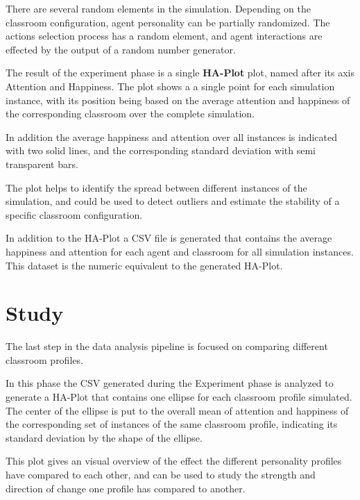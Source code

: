 There are several random elements in the simulation. Depending on the classroom
configuration, agent personality can be partially randomized. The actions selection
process has a random element, and agent interactions are effected by the output of
a random number generator.

\bb

The result of the experiment phase is a single \textbf{HA-Plot} plot, named after
its axis Attention and Happiness. The plot shows a a single point for each simulation
instance, with its position being based on the average attention and happiness of
the corresponding classroom over the complete simulation.

In addition the average happiness and attention over all instances is
indicated with two solid lines, and the corresponding standard deviation with
semi transparent bars.

The plot helps to identify the spread between different instances of the simulation, and
could be used to detect outliers and estimate the stability of a specific classroom
configuration.

In addition to the HA-Plot a CSV file is generated that contains the average
happiness and attention for each agent and classroom for all simulation instances.
This dataset is the numeric equivalent to the generated HA-Plot.


\section{Study}
The last step in the data analysis pipeline is focused on comparing different classroom
profiles.

In this phase the CSV generated during the Experiment phase is analyzed to
generate a HA-Plot that contains one ellipse for each classroom profile simulated.
The center of the ellipse is put to the overall mean of attention and happiness
of the corresponding set of instances of the same classroom profile, indicating its standard
deviation by the shape of the ellipse.

This plot gives an visual overview of the effect the different personality profiles
have compared to each other, and can be used to study the strength and direction of
change one profile has compared to another.

\begin{figure}[H]
\end{figure}
